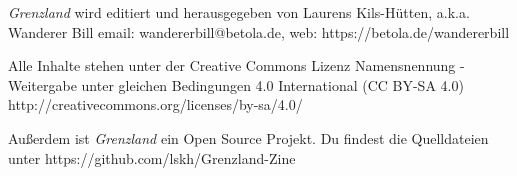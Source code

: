 \documentclass[11pt]{wbzine}
\begin{document}
\textit{Grenzland} wird editiert und 
herausgegeben von Laurens Kils-Hütten,
a.k.a. Wanderer Bill 
email: wandererbill@betola.de, web: https://betola.de/wandererbill

Alle Inhalte stehen unter der Creative Commons Lizenz 
Namensnennung - Weitergabe unter gleichen Bedingungen 4.0 International 
(CC BY-SA 4.0)
http://creativecommons.org/licenses/by-sa/4.0/

Außerdem ist \textit{Grenzland} ein Open Source Projekt. Du
findest die Quelldateien unter https://github.com/lskh/Grenzland-Zine

\end{document}
